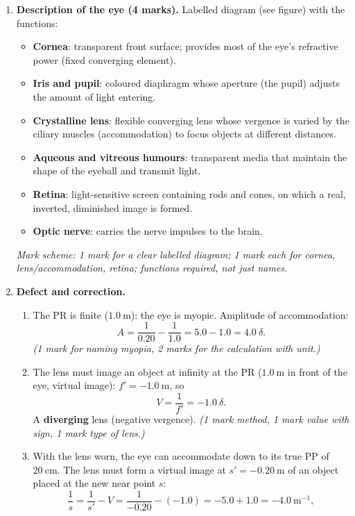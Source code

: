 \documentclass[11pt]{article}
\newcommand{\cle}[1]{{\popxbold\color{popdark}#1}}
\begin{document}
\begin{corrige}
\begin{enumerate}
\item \textbf{Description of the eye (4 marks).} Labelled diagram (see figure) with the functions:
\begin{itemize}
\item \textbf{Cornea}: transparent front surface; provides most of the eye's refractive power (fixed converging element).
\item \textbf{Iris and pupil}: coloured diaphragm whose aperture (the pupil) adjusts the amount of light entering.
\item \textbf{Crystalline lens}: flexible converging lens whose vergence is varied by the ciliary muscles (accommodation) to focus objects at different distances.
\item \textbf{Aqueous and vitreous humours}: transparent media that maintain the shape of the eyeball and transmit light.
\item \textbf{Retina}: light-sensitive screen containing rods and cones, on which a real, inverted, diminished image is formed.
\item \textbf{Optic nerve}: carries the nerve impulses to the brain.
\end{itemize}
\emph{Mark scheme: 1 mark for a clear labelled diagram; 1 mark each for cornea, lens/accommodation, retina; functions required, not just names.}
\item \textbf{Defect and correction.}
\begin{enumerate}
\item The PR is finite ($1.0\ \mathrm{m}$): the eye is \cle{myopic}. Amplitude of accommodation:
\[ A = \frac{1}{0.20} - \frac{1}{1.0} = 5.0 - 1.0 = 4.0\ \delta. \]
\emph{(1 mark for naming myopia, 2 marks for the calculation with unit.)}
\item The lens must image an object at infinity at the PR ($1.0\ \mathrm{m}$ in front of the eye, virtual image): $f' = -1.0\ \mathrm{m}$, so
\[ V = \frac{1}{f'} = -1.0\ \delta. \]
A \textbf{diverging} lens (negative vergence). \emph{(1 mark method, 1 mark value with sign, 1 mark type of lens.)}
\item With the lens worn, the eye can accommodate down to its true PP of $20\ \mathrm{cm}$. The lens must form a virtual image at $s' = -0.20\ \mathrm{m}$ of an object placed at the new near point $s$:
\[ \frac{1}{s} = \frac{1}{s'} - V = \frac{1}{-0.20} - (-1.0) = -5.0 + 1.0 = -4.0\ \mathrm{m^{-1}}, \]

\end{enumerate}
\end{enumerate}
\end{corrige}
\end{document}
